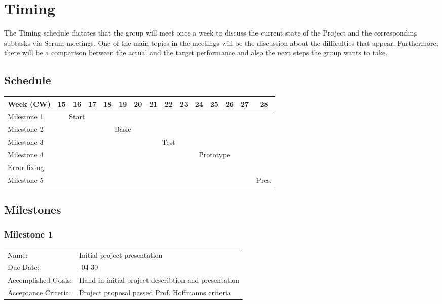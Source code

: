 \documentclass[a4paper, 12pt]{scrartcl}%
\newcommand{\explanation}[1]{{\sffamily #1}}
\begin{document}
\section{Timing}
The Timing schedule dictates that the group will meet once a week to discuss the current state of the Project and the corresponding subtasks via Scrum meetings. One of the main topics in the meetings will be the discussion about the difficulties that appear. Furthermore, there will be a comparison between the actual and the target performance and also the next steps the group wants to take.\newline


\subsection*{Schedule}
\begin{center}
	\begin{footnotesize}
		\begin{tabular}{|l|c|c|c|c|c|c|c|c|c|c|c|c|c|c|}
			\hline
			Week (CW) & 15 & 16 & 17 & 18 & 19 & 20 & 21 & 22 & 23 & 24 & 25 & 26 & 27 & 28 \\
			\hline
			Milestone 1      & \multicolumn{3}{c|}{Start}&\multicolumn{11}{c|}{}\\
			\hline
			Milestone 2      & \multicolumn{3}{c|}{}&\multicolumn{3}{c|}{Basic}&\multicolumn{8}{c|}{}\\
			\hline
			Milestone 3      & \multicolumn{6}{c|}{}&\multicolumn{3}{c|}{Test}&\multicolumn{5}{c|}{}\\
			\hline
			Milestone 4      & \multicolumn{9}{c|}{}&\multicolumn{3}{c|}{Prototype}&\multicolumn{2}{c|}{}\\
			\hline
			Error fixing     & \multicolumn{12}{c|}{}&\multicolumn{1}{c|}{}&\multicolumn{1}{c|}{}\\
			\hline
			Milestone 5      & \multicolumn{13}{c|}{}&\multicolumn{1}{c|}{Pres.}\\
			\hline
		\end{tabular}
	\end{footnotesize}
\end{center}

\subsection{Milestones}
\subsubsection*{Milestone 1}
\begin{tabular}{lp{10cm}}
	Name:      & \explanation{Initial project presentation}\\
	Due Date: & \explanation{2019-04-30}\\
	Accomplished Goals: & \explanation{Hand in initial project describtion and presentation}\\
	Acceptance Criteria: & \explanation{Project proposal passed Prof. Hoffmanns criteria}
\end{tabular}
\end{document}
